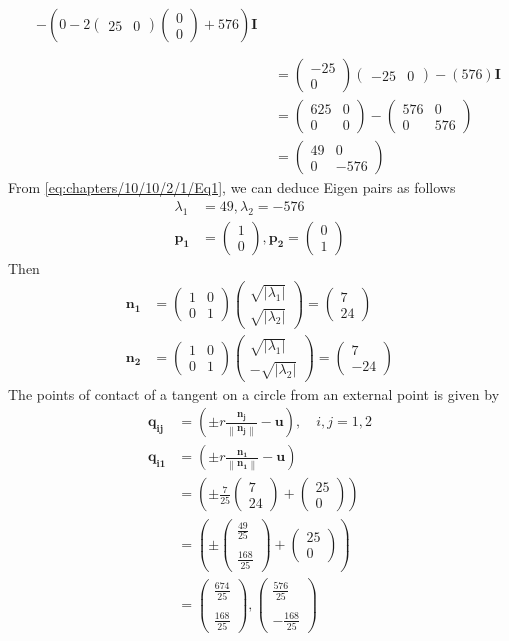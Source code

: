 \documentclass[12pt]{article}
\providecommand{\brak}[1]{\ensuremath{\left(#1\right)}}
\providecommand{\norm}[1]{\left\lVert#1\right\rVert}
\providecommand{\abs}[1]{\left\vert#1\right\vert}
\newcommand{\myvec}[1]{\ensuremath{\begin{pmatrix}#1\end{pmatrix}}}
\let\vec\mathbf
\begin{document}
\begin{enumerate}
\begin{align}
\begin{split}
	   & -\brak{0-2\myvec{25&0}\myvec{0 \\0}+576}\vec{I}\\ 
  \end{split}\\
	&= \myvec{-25\\0}\myvec{-25&0} - \brak{576}\vec{I} \\ 
	&= \myvec{625&0\\0&0 } - \myvec{576&0\\0&576} \\ 
        \label{eq:chapters/10/10/2/1/Eq1}
	&= \myvec{49&0\\0&-576 } 
\end{align}
From \eqref{eq:chapters/10/10/2/1/Eq1}, we can deduce Eigen pairs as follows 
\begin{align}
	\lambda_1 &= 49 , \lambda_2 = -576 \\
	\vec{p_1} &= \myvec{1\\0} , \vec{p_2} = \myvec{0\\1}
\end{align}
Then
\begin{align}
	\vec{n_1} &= \myvec{1&0\\0&1}\myvec{\sqrt{\abs{\lambda_1}} \\ \sqrt{\abs{\lambda_2}}} = \myvec{7\\24} \\
	\vec{n_2} &= \myvec{1&0\\0&1}\myvec{\sqrt{\abs{\lambda_1}} \\ -\sqrt{\abs{\lambda_2}}} = \myvec{7\\-24}
\end{align}
The points of contact of a tangent on a circle from an external point is given by 
\begin{align}
	\vec{q_{ij}} &= \brak{\pm r \frac{\vec{n_j}}{\norm{\vec{n_j}}}- \vec{u}},  \quad i,j = 1,2 \\
	\vec{q_{i1}} &= \brak{\pm r \frac{\vec{n_1}}{\norm{\vec{n_1}}}- \vec{u}} \\
	&= \brak{\pm \frac{7}{25}\myvec{7\\24}+ \myvec{25\\0}} \\
	&= \brak{\pm \myvec{\frac{49}{25} \\ \\[1pt] \frac{168}{25}} + \myvec{25\\0}} \\
	&= \myvec{\frac{674}{25} \\ \\[1pt] \frac{168}{25}}, \myvec{\frac{576}{25} \\ \\[1pt] -\frac{168}{25}}

\end{align}
\end{enumerate}
\end{document}
